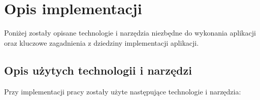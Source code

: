 \chapter{Opis implementacji}
\label{cha:uzywaneTechnologie}

Poniżej zostały opisane technologie i narzędzia niezbędne do wykonania aplikacji oraz kluczowe zagadnienia z dziedziny implementacji aplikacji.


\section{Opis użytych technologii i narzędzi}
\label{sec:technology}
Przy implementacji pracy zostały użyte następujące technologie i narzędzia:
